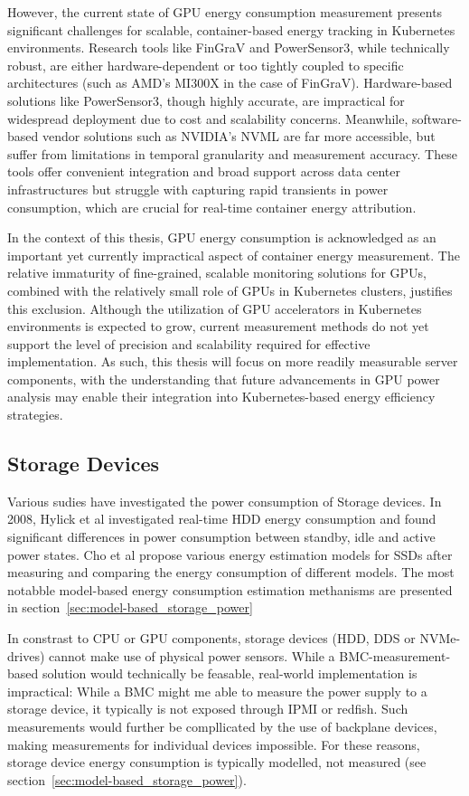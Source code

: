 However, the current state of GPU energy consumption measurement presents significant challenges for scalable, container-based energy tracking in Kubernetes environments. Research tools like FinGraV and PowerSensor3, while technically robust, are either hardware-dependent or too tightly coupled to specific architectures (such as AMD's MI300X in the case of FinGraV). Hardware-based solutions like PowerSensor3, though highly accurate, are impractical for widespread deployment due to cost and scalability concerns. Meanwhile, software-based vendor solutions such as NVIDIA's NVML are far more accessible, but suffer from limitations in temporal granularity and measurement accuracy. These tools offer convenient integration and broad support across data center infrastructures but struggle with capturing rapid transients in power consumption, which are crucial for real-time container energy attribution. 

In the context of this thesis, GPU energy consumption is acknowledged as an important yet currently impractical aspect of container energy measurement. The relative immaturity of fine-grained, scalable monitoring solutions for GPUs, combined with the relatively small role of GPUs in Kubernetes clusters, justifies this exclusion. Although the utilization of GPU accelerators in Kubernetes environments is expected to grow, current measurement methods do not yet support the level of precision and scalability required for effective implementation. As such, this thesis will focus on more readily measurable server components, with the understanding that future advancements in GPU power analysis may enable their integration into Kubernetes-based energy efficiency strategies.

\subsection{Storage Devices}
Various sudies have investigated the power consumption of Storage devices. In 2008, Hylick et al\parencite{hylickAnalysisHardDrive2008a} investigated real-time HDD energy consumption and found significant differences in power consumption between standby, idle and active power states. Cho et al\parencite{choDesignTradeoffsSSDs2015} propose various energy estimation models for SSDs after measuring and comparing the energy consumption of different models. The most notabble model-based energy consumption estimation methanisms are presented in section~\ref{sec:model-based_storage_power}

In constrast to CPU or GPU components, storage devices (HDD, DDS or NVMe-drives) cannot make use of physical power sensors. While a BMC-measurement-based solution would technically be feasable, real-world implementation is impractical: While a BMC might me able to measure the power supply to a storage device, it typically is not exposed through IPMI or redfish. Such measurements would further be compllicated by the use of backplane devices, making measurements for individual devices impossible. For these reasons, storage device energy consumption is typically modelled, not measured (see section~\ref{sec:model-based_storage_power}).


